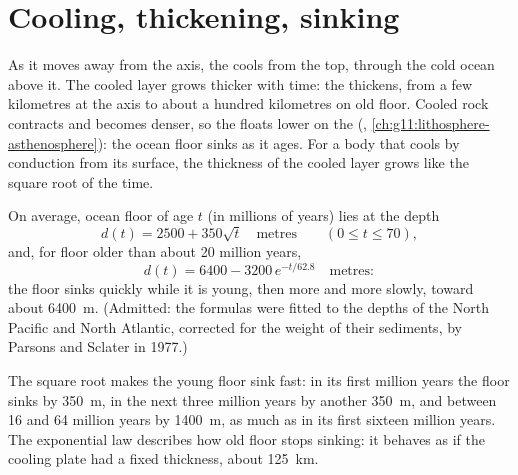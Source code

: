 \section{Cooling, thickening, sinking}

As it moves away from the axis, the  cools from the top, through
the cold ocean above it. The cooled layer grows thicker with time: the
 thickens, from a few kilometres at the axis to about a hundred
kilometres on old floor. Cooled rock contracts and becomes denser, so the
 floats lower on the  (,
\cref{ch:g11:lithosphere-asthenosphere}): the ocean floor sinks as it ages.
For a body that cools by conduction from its surface, the thickness of the
cooled layer grows like the square root of the time.

\begin{proposition}\label{prop:g11:ocean-ridges:depth-age}
On average, ocean floor of age $t$ (in millions of years) lies at the depth
\[
  d(t) = 2500 + 350\sqrt{t} \quad \text{metres} \qquad (0 \le t \le 70),
\]
and, for floor older than about 20 million years,
\[
  d(t) = 6400 - 3200\,e^{-t/62.8} \quad \text{metres}:
\]
the floor sinks quickly while it is young, then more and more slowly, toward
about \qty{6400}{m}. (Admitted: the formulas were fitted to the depths of the
North Pacific and North Atlantic, corrected for the weight of their
sediments, by Parsons and Sclater in 1977.)
\end{proposition}

The square root makes the young floor sink fast: in its first million years
the floor sinks by \qty{350}{m}, in the next three million years by another
\qty{350}{m}, and between 16 and 64 million years by \qty{1400}{m}, as much as
in its first sixteen million years. The exponential law describes how old
floor stops sinking: it behaves as if the cooling plate had a fixed thickness,
about \qty{125}{km}.

